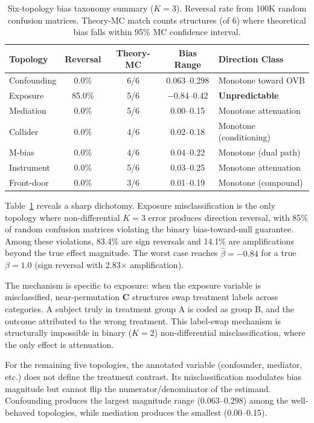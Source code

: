 \documentclass[11pt]{article}
\newcommand{\Cmat}{\mathbf{C}}
\begin{document}
\begin{table}[t]
\centering
\caption{Six-topology bias taxonomy summary ($K=3$). Reversal rate from 100K random confusion matrices. Theory-MC match counts structures (of 6) where theoretical bias falls within 95\% MC confidence interval.}
\label{tab:taxonomy-summary}
\small
\begin{tabular}{lcccl}
\toprule
Topology & Reversal & Theory-MC & Bias Range & Direction Class \\
\midrule
Confounding & 0.0\% & 6/6 & 0.063--0.298 & Monotone toward OVB \\
Exposure & 85.0\% & 5/6 & $-$0.84--0.42 & \textbf{Unpredictable} \\
Mediation & 0.0\% & 5/6 & 0.00--0.15 & Monotone attenuation \\
Collider & 0.0\% & 4/6 & 0.02--0.18 & Monotone (conditioning) \\
M-bias & 0.0\% & 4/6 & 0.04--0.22 & Monotone (dual path) \\
Instrument & 0.0\% & 5/6 & 0.03--0.25 & Monotone attenuation \\
Front-door & 0.0\% & 3/6 & 0.01--0.19 & Monotone (compound) \\
\bottomrule
\end{tabular}
\end{table}

Table~\ref{tab:taxonomy-summary} reveals a sharp dichotomy.
Exposure misclassification is the only topology where non-differential $K=3$ error produces direction reversal, with 85\% of random confusion matrices violating the binary bias-toward-null guarantee.
Among these violations, 83.4\% are sign reversals and 14.1\% are amplifications beyond the true effect magnitude.
The worst case reaches $\hat{\beta} = -0.84$ for a true $\beta = 1.0$ (sign reversal with 2.83$\times$ amplification).

The mechanism is specific to exposure: when the exposure variable is misclassified, near-permutation $\Cmat$ structures swap treatment labels across categories.
A subject truly in treatment group A is coded as group B, and the outcome attributed to the wrong treatment.
This label-swap mechanism is structurally impossible in binary ($K=2$) non-differential misclassification, where the only effect is attenuation.

For the remaining five topologies, the annotated variable (confounder, mediator, etc.) does not define the treatment contrast.
Its misclassification modulates bias magnitude but cannot flip the numerator/denominator of the estimand.
Confounding produces the largest magnitude range (0.063--0.298) among the well-behaved topologies, while mediation produces the smallest (0.00--0.15).
\end{document}
